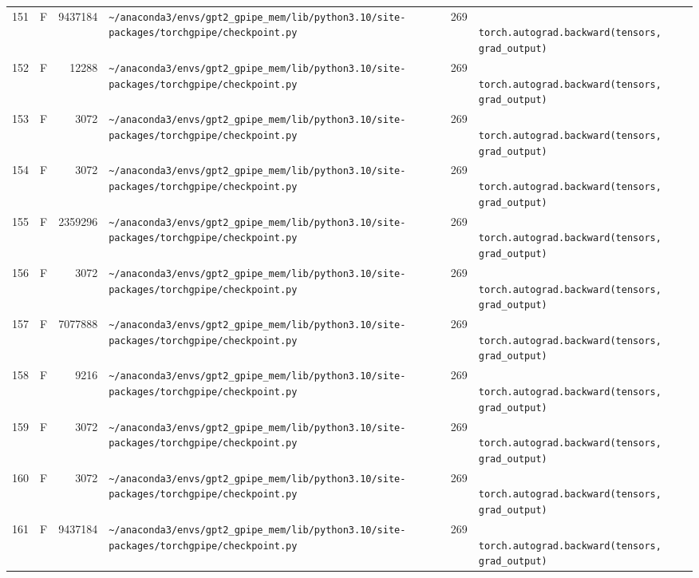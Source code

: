\documentclass{article}
\begin{document}
\begin{longtable}{r l r p{6.5cm} r p{7.0cm}}
151 & F & 9437184 & \lstinline|~/anaconda3/envs/gpt2_gpipe_mem/lib/python3.10/site-packages/torchgpipe/checkpoint.py| & 269 & \lstinline|            torch.autograd.backward(tensors, grad_output)| \\
152 & F & 12288 & \lstinline|~/anaconda3/envs/gpt2_gpipe_mem/lib/python3.10/site-packages/torchgpipe/checkpoint.py| & 269 & \lstinline|            torch.autograd.backward(tensors, grad_output)| \\
153 & F & 3072 & \lstinline|~/anaconda3/envs/gpt2_gpipe_mem/lib/python3.10/site-packages/torchgpipe/checkpoint.py| & 269 & \lstinline|            torch.autograd.backward(tensors, grad_output)| \\
154 & F & 3072 & \lstinline|~/anaconda3/envs/gpt2_gpipe_mem/lib/python3.10/site-packages/torchgpipe/checkpoint.py| & 269 & \lstinline|            torch.autograd.backward(tensors, grad_output)| \\
155 & F & 2359296 & \lstinline|~/anaconda3/envs/gpt2_gpipe_mem/lib/python3.10/site-packages/torchgpipe/checkpoint.py| & 269 & \lstinline|            torch.autograd.backward(tensors, grad_output)| \\
156 & F & 3072 & \lstinline|~/anaconda3/envs/gpt2_gpipe_mem/lib/python3.10/site-packages/torchgpipe/checkpoint.py| & 269 & \lstinline|            torch.autograd.backward(tensors, grad_output)| \\
157 & F & 7077888 & \lstinline|~/anaconda3/envs/gpt2_gpipe_mem/lib/python3.10/site-packages/torchgpipe/checkpoint.py| & 269 & \lstinline|            torch.autograd.backward(tensors, grad_output)| \\
158 & F & 9216 & \lstinline|~/anaconda3/envs/gpt2_gpipe_mem/lib/python3.10/site-packages/torchgpipe/checkpoint.py| & 269 & \lstinline|            torch.autograd.backward(tensors, grad_output)| \\
159 & F & 3072 & \lstinline|~/anaconda3/envs/gpt2_gpipe_mem/lib/python3.10/site-packages/torchgpipe/checkpoint.py| & 269 & \lstinline|            torch.autograd.backward(tensors, grad_output)| \\
160 & F & 3072 & \lstinline|~/anaconda3/envs/gpt2_gpipe_mem/lib/python3.10/site-packages/torchgpipe/checkpoint.py| & 269 & \lstinline|            torch.autograd.backward(tensors, grad_output)| \\
161 & F & 9437184 & \lstinline|~/anaconda3/envs/gpt2_gpipe_mem/lib/python3.10/site-packages/torchgpipe/checkpoint.py| & 269 & \lstinline|            torch.autograd.backward(tensors, grad_output)| \\

\end{longtable}
\end{document}
